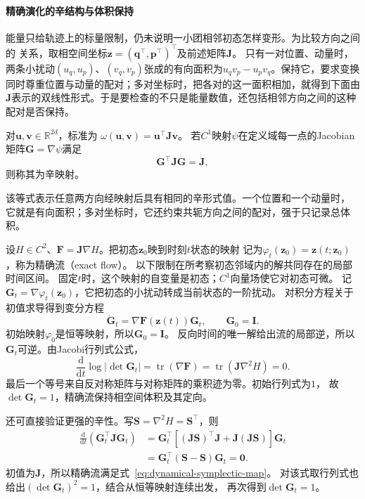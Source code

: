 \paragraph{精确演化的辛结构与体积保持}
能量只给轨迹上的标量限制，仍未说明一小团相邻初态怎样变形。为比较方向之间的
关系，取相空间坐标$\bm z=(\bm q^\top,\bm p^\top)^\top$及前述矩阵$\bm J$。
只有一对位置、动量时，两条小扰动\((u_q,u_p)\)、\((v_q,v_p)\)张成的有向面积为\(u_qv_p-u_pv_q\)。保持它，要求变换同时尊重位置与动量的配对；多对坐标时，把各对的这一面积相加，就得到下面由\(\bm J\)表示的双线性形式。于是要检查的不只是能量数值，还包括相邻方向之间的这种配对是否保持。
\begin{definition}[标准辛形式与辛映射]
  \label{def:dynamical-symplectic-form-map}
  对$\bm u,\bm v\in\mathbb R^{2d}$，标准为
  $\omega(\bm u,\bm v)=\bm u^\top\bm J\bm v$。
  若$C^1$映射$\psi$在定义域每一点的Jacobian矩阵$\bm G=\nabla\psi$满足
  \begin{equation}
    \bm G^\top\bm J\bm G=\bm J,
    \label{eq:dynamical-symplectic-map}
  \end{equation}
  则称其为辛映射。
\end{definition}
该等式表示任意两方向经映射后具有相同的辛形式值。一个位置和一个动量时，
它就是有向面积；多对坐标时，它还约束共轭方向之间的配对，强于只记录总体积。

设$H\in C^2$、$\bm F=\bm J\nabla H$。把初态$\bm z_0$映到时刻$t$状态的映射
记为$\varphi_t(\bm z_0)=\bm z(t;\bm z_0)$，称为精确流（exact flow）。
以下限制在所考察初态邻域内的解共同存在的局部时间区间。
固定$t$时，这个映射的自变量是初态；$C^1$向量场使它对初态可微。
记$\bm G_t=\nabla\varphi_t(\bm z_0)$，它把初态的小扰动转成当前状态的一阶扰动。
对积分方程关于初值求导得到变分方程
\[
  \dot{\bm G}_t=\nabla\bm F(\bm z(t))\bm G_t,\qquad \bm G_0=\bm I.
\]
初始映射$\varphi_0$是恒等映射，所以$\bm G_0=\bm I$。
反向时间的唯一解给出流的局部逆，所以$\bm G_t$可逆。由Jacobi行列式公式，
\[
  \frac{\mathrm d}{\mathrm dt}\log|\det\bm G_t|
  =\operatorname{tr}(\nabla\bm F)
  =\operatorname{tr}(\bm J\nabla^2H)=0.
\]
最后一个等号来自反对称矩阵与对称矩阵的乘积迹为零。初始行列式为$1$，
故$\det\bm G_t=1$，精确流保持相空间体积及其定向。

还可直接验证更强的辛性。写$\bm S=\nabla^2H=\bm S^\top$，则
\[
  \begin{aligned}
    \frac{\mathrm d}{\mathrm dt}(\bm G_t^\top\bm J\bm G_t)
    &=\bm G_t^\top[(\bm J\bm S)^\top\bm J
                         +\bm J(\bm J\bm S)]\bm G_t\\
    &=\bm G_t^\top(\bm S-\bm S)\bm G_t=\bm0.
  \end{aligned}
\]
初值为$\bm J$，所以精确流满足式~\eqref{eq:dynamical-symplectic-map}。
对该式取行列式也给出$(\det\bm G_t)^2=1$，结合从恒等映射连续出发，
再次得到$\det\bm G_t=1$。

